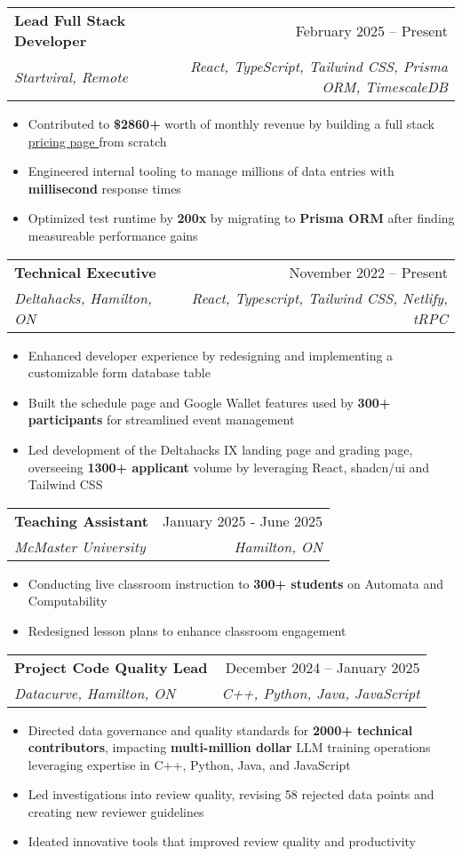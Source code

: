 \documentclass[letterpaper,11pt]{article}
\makeatletter
\newcommand{\resumeItem}[1]{
  \item\small{
    {#1 \vspace{-2pt}}
  }
}
\newcommand{\resumeSubheading}[4]{
  \vspace{-2pt}\item
    \begin{tabular*}{0.97\textwidth}[t]{l@{\extracolsep{\fill}}r}
      \textbf{#1} & #2 \\
      \textit{\small#3} & \textit{\small #4} \\
    \end{tabular*}\vspace{-7pt}
}
\newcommand{\resumeItemListStart}{\begin{itemize}}
\newcommand{\resumeItemListEnd}{\end{itemize}\vspace{-5pt}}
\makeatother
\begin{document}
\resumeSubheading
{Lead Full Stack Developer}{February 2025 -- Present}
{Startviral, Remote}{React, TypeScript, Tailwind CSS, Prisma ORM, TimescaleDB}
\resumeItemListStart
\resumeItem{Contributed to \textbf{\$2860+} worth of monthly revenue by building a full stack \href{https://pricing.startviral.de}{\underline{pricing page \faIcon{external-link-alt}}} from scratch}
\resumeItem{Engineered internal tooling to manage millions of data entries with \textbf{millisecond} response times}
\resumeItem{Optimized test runtime by \textbf{200x} by migrating to \textbf{Prisma ORM} after finding measureable performance gains}
\resumeItemListEnd

\resumeSubheading
{Technical Executive}{November 2022 -- Present}
{Deltahacks, Hamilton, ON}{React, Typescript, Tailwind CSS, Netlify, tRPC}
\resumeItemListStart
\resumeItem{Enhanced developer experience by redesigning and implementing a customizable form database table}
\resumeItem{Built the schedule page and Google Wallet features used by \textbf{300+ participants} for streamlined event management}
\resumeItem{Led development of the Deltahacks IX landing page and grading page, overseeing \textbf{1300+ applicant} volume by leveraging React, shadcn/ui and Tailwind CSS}
\resumeItemListEnd

\resumeSubheading
{Teaching Assistant}{January 2025 - June 2025}
{McMaster University}{Hamilton, ON}
\resumeItemListStart
\resumeItem{Conducting live classroom instruction to \textbf{300+ students} on Automata and Computability}
\resumeItem{Redesigned lesson plans to enhance classroom engagement}
\resumeItemListEnd

\resumeSubheading
{Project Code Quality Lead}{December 2024 -- January 2025}
{Datacurve, Hamilton, ON}{C++, Python, Java, JavaScript}
\resumeItemListStart
\resumeItem{Directed data governance and quality standards for \textbf{2000+ technical contributors}, impacting \textbf{multi-million dollar} LLM training operations leveraging expertise in C++, Python, Java, and JavaScript}
\resumeItem{Led investigations into review quality, revising 58 rejected data points and creating new reviewer guidelines}
\resumeItem{Ideated innovative tools that improved review quality and productivity}
\resumeItemListEnd

\end{document}
